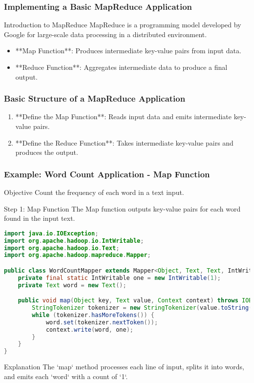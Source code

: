 \documentclass[aspectratio=169]{beamer}
\begin{document}
\begin{frame}
    \frametitle{Implementing a Basic MapReduce Application}
    \begin{block}{Introduction to MapReduce}
        MapReduce is a programming model developed by Google for large-scale data processing in a distributed environment. 
        \begin{itemize}
            \item **Map Function**: Produces intermediate key-value pairs from input data.
            \item **Reduce Function**: Aggregates intermediate data to produce a final output.
        \end{itemize}
    \end{block}
\end{frame}

\begin{frame}
    \frametitle{Basic Structure of a MapReduce Application}
    \begin{enumerate}
        \item **Define the Map Function**: Reads input data and emits intermediate key-value pairs.
        \item **Define the Reduce Function**: Takes intermediate key-value pairs and produces the output.
    \end{enumerate}
\end{frame}

\begin{frame}[fragile]
    \frametitle{Example: Word Count Application - Map Function}
    \begin{block}{Objective}
        Count the frequency of each word in a text input.
    \end{block}
    
    \begin{block}{Step 1: Map Function}
        The Map function outputs key-value pairs for each word found in the input text.
    \end{block}
    
    \begin{lstlisting}[language=Java]
import java.io.IOException;
import org.apache.hadoop.io.IntWritable;
import org.apache.hadoop.io.Text;
import org.apache.hadoop.mapreduce.Mapper;

public class WordCountMapper extends Mapper<Object, Text, Text, IntWritable> {
    private final static IntWritable one = new IntWritable(1);
    private Text word = new Text();

    public void map(Object key, Text value, Context context) throws IOException, InterruptedException {
        StringTokenizer tokenizer = new StringTokenizer(value.toString());
        while (tokenizer.hasMoreTokens()) {
            word.set(tokenizer.nextToken());
            context.write(word, one);
        }
    }
}
    \end{lstlisting}
    
    \begin{block}{Explanation}
        The `map` method processes each line of input, splits it into words, and emits each `word` with a count of `1`.
    \end{block}
\end{frame}
\end{document}
